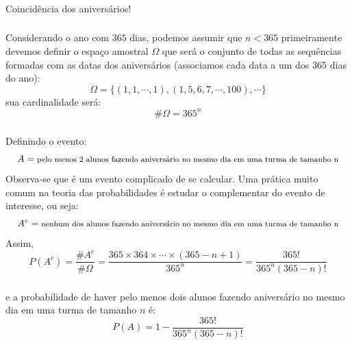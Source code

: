 \documentclass[14pt,aspectratio=1610]{beamer}
\begin{document}
\begin{frame}[fragile]{}
\frametitle{}
\begin{block}{}
\centering
Coincidência dos aniversários!
\end{block}
\end{frame}

\begin{frame}{}
\frametitle{}
\begin{block}{}
\justifying
Considerando o ano com $365$ dias, podemos assumir que $n<365$ primeiramente devemos definir o espaço amostral $\Omega$ que será o conjunto de todas as sequências formadas com as datas dos aniversários (associamos cada data a um dos 365 dias do ano):
$$\Omega=\{(1,1,\cdots,1),(1,5,6,7,\cdots,100),\cdots\}$$
sua cardinalidade será: $$\# \Omega=365^{n}$$

\end{block}
\end{frame}

\begin{frame}{}
\frametitle{}
\small
\begin{block}{}
\justifying
Definindo o evento:
$${\footnotesize A=\textrm{pelo menos 2 alunos fazendo aniversário no mesmo dia em uma turma de tamanho n}}$$
Observa-se que é um evento complicado de se calcular. Uma prática muito comum na teoria das probabilidades é estudar o complementar do evento de interesse, ou seja:
$${\footnotesize A^{c}=\textrm{nenhum dos alunos fazendo aniversário no mesmo dia em uma turma de tamanho n}}$$
Assim, 
$$P(A^{c})=\dfrac{\# A^{c}}{\# \Omega}=\dfrac{365\times 364\times \cdots \times (365-n+1)}{365^{n}}=\dfrac{365!}{365^{n}(365-n)!}$$
\end{block}
\end{frame}

\begin{frame}{}
\frametitle{}
\begin{block}{}
\justifying
e a probabilidade de haver pelo menos dois alunos fazendo aniversário no mesmo dia em uma turma de tamanho $n$ é:
$$P(A)=1-\dfrac{365!}{365^{n}(365-n)!}$$


\end{block}
\end{frame}
\end{document}
